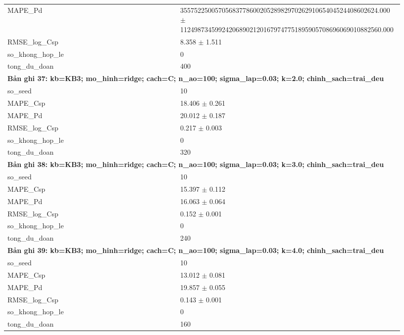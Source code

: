 \begin{longtable}{p{0.43\linewidth}p{0.50\linewidth}}
MAPE\_\allowbreak Pd & 355752250057056837786002052898297026291065404524408602624.000 $\pm$ 1124987345992420689021201679747751895905708696069010882560.000 \\
RMSE\_\allowbreak log\_\allowbreak Csp & 8.358 $\pm$ 1.511 \\
so\_\allowbreak khong\_\allowbreak hop\_\allowbreak le & 0 \\
tong\_\allowbreak du\_\allowbreak doan & 400 \\
\midrule
\multicolumn{2}{p{0.95\linewidth}}{\textbf{Bản ghi 37: kb=KB3; mo\_hinh=ridge; cach=C; n\_ao=100; sigma\_lap=0.03; k=2.0; chinh\_sach=trai\_deu}} \\
so\_\allowbreak seed & 10 \\
MAPE\_\allowbreak Csp & 18.406 $\pm$ 0.261 \\
MAPE\_\allowbreak Pd & 20.012 $\pm$ 0.187 \\
RMSE\_\allowbreak log\_\allowbreak Csp & 0.217 $\pm$ 0.003 \\
so\_\allowbreak khong\_\allowbreak hop\_\allowbreak le & 0 \\
tong\_\allowbreak du\_\allowbreak doan & 320 \\
\midrule
\multicolumn{2}{p{0.95\linewidth}}{\textbf{Bản ghi 38: kb=KB3; mo\_hinh=ridge; cach=C; n\_ao=100; sigma\_lap=0.03; k=3.0; chinh\_sach=trai\_deu}} \\
so\_\allowbreak seed & 10 \\
MAPE\_\allowbreak Csp & 15.397 $\pm$ 0.112 \\
MAPE\_\allowbreak Pd & 16.063 $\pm$ 0.064 \\
RMSE\_\allowbreak log\_\allowbreak Csp & 0.152 $\pm$ 0.001 \\
so\_\allowbreak khong\_\allowbreak hop\_\allowbreak le & 0 \\
tong\_\allowbreak du\_\allowbreak doan & 240 \\
\midrule
\multicolumn{2}{p{0.95\linewidth}}{\textbf{Bản ghi 39: kb=KB3; mo\_hinh=ridge; cach=C; n\_ao=100; sigma\_lap=0.03; k=4.0; chinh\_sach=trai\_deu}} \\
so\_\allowbreak seed & 10 \\
MAPE\_\allowbreak Csp & 13.012 $\pm$ 0.081 \\
MAPE\_\allowbreak Pd & 19.857 $\pm$ 0.055 \\
RMSE\_\allowbreak log\_\allowbreak Csp & 0.143 $\pm$ 0.001 \\
so\_\allowbreak khong\_\allowbreak hop\_\allowbreak le & 0 \\
tong\_\allowbreak du\_\allowbreak doan & 160 \\

\end{longtable}
